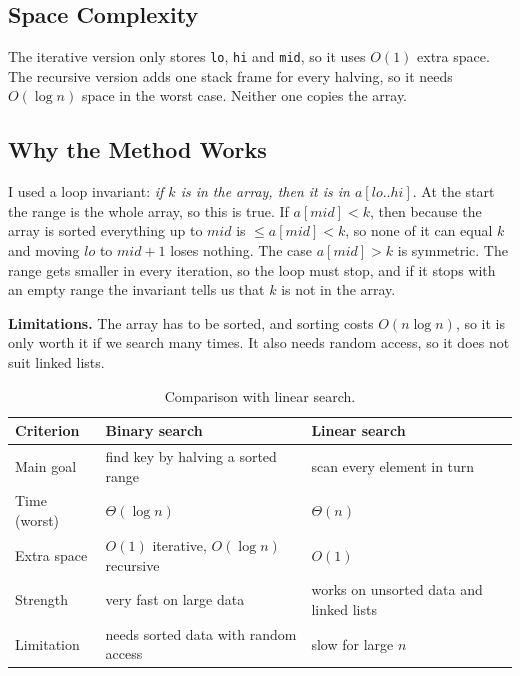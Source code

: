 \documentclass[11pt,a4paper]{article}
\begin{document}
\subsection*{Space Complexity}
The iterative version only stores \texttt{lo}, \texttt{hi} and \texttt{mid}, so it
uses $O(1)$ extra space. The recursive version adds one stack frame for every
halving, so it needs $O(\log n)$ space in the worst case. Neither one copies the
array.

\subsection*{Why the Method Works}
I used a loop invariant: \emph{if $k$ is in the array, then it is in
$a[\mathit{lo}..\mathit{hi}]$}. At the start the range is the whole array, so this
is true. If $a[\mathit{mid}]<k$, then because the array is sorted everything up
to $\mathit{mid}$ is $\le a[\mathit{mid}]<k$, so none of it can equal $k$ and
moving $\mathit{lo}$ to $\mathit{mid}+1$ loses nothing. The case
$a[\mathit{mid}]>k$ is symmetric. The range gets smaller in every iteration, so
the loop must stop, and if it stops with an empty range the invariant tells us
that $k$ is not in the array.

\textbf{Limitations.} The array has to be sorted, and sorting costs
$O(n\log n)$, so it is only worth it if we search many times. It also needs
random access, so it does not suit linked lists.

\begin{table}[h]
\centering
\begin{tabular}{@{}lll@{}}
\toprule
\textbf{Criterion} & \textbf{Binary search} & \textbf{Linear search} \\
\midrule
Main goal & find key by halving a sorted range & scan every element in turn \\
Time (worst) & $\Theta(\log n)$ & $\Theta(n)$ \\
Extra space & $O(1)$ iterative, $O(\log n)$ recursive & $O(1)$ \\
Strength & very fast on large data & works on unsorted data and linked lists \\
Limitation & needs sorted data with random access & slow for large $n$ \\
\bottomrule
\end{tabular}
\caption{Comparison with linear search.}
\end{table}

\end{document}
